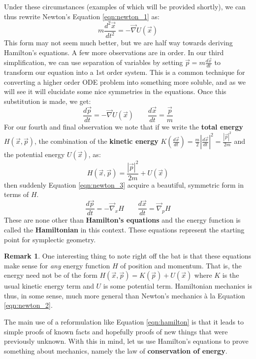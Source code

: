 \documentclass[12pt]{article}
\theoremstyle{definition}
\newtheorem{remark}[theorem]{Remark}
\numberwithin{equation}{section}
\begin{document}
Under these circumstances (examples of which will be provided shortly), we can thus rewrite Newton's Equation \ref{eqn:newton_1} as:
\begin{equation} \label{eqn:newton_2}
m \frac{d^2\vec{x}}{dt^2} = -\vec{\nabla} U(\vec{x})
\end{equation}
This form may not seem much better, but we are half way towards deriving Hamilton's equations. A few more observations are in order. In our third simplification, we can use separation of variables by setting $\vec{p} = m\frac{d\vec{x}}{dt}$ to transform our equation into a 1st order system. This is a common technique for converting a higher order ODE problem into something more soluble, and as we will see it will elucidate some nice symmetries in the equations. Once this substitution is made, we get:
\begin{equation} \label{eqn:newton_3}
\frac{d\vec{p}}{dt} = -\vec{\nabla} U(\vec{x}) \qquad \frac{d\vec{x}}{dt} = \frac{\vec{p}}{m}
\end{equation}
For our fourth and final observation we note that if we write the {\bf total energy} $H(\vec{x},\vec{p})$, the combination of the {\bf kinetic energy} $K(\frac{d\vec{x}}{dt}) = \frac{m}{2}|\frac{d\vec{x}}{dt}|^2 = \frac{|\vec{p}|^2}{2m}$ and the potential energy $U(\vec{x})$, as:
\[
H(\vec{x},\vec{p}) = \frac{|\vec{p}|^2}{2m} + U(\vec{x})
\]
then suddenly Equation \ref{eqn:newton_3} acquire a beautiful, symmetric form in terms of $H$.
\begin{equation} \label{eqn:hamilton}
\frac{d\vec{p}}{dt} = -\vec{\nabla}_x H  \qquad \frac{d\vec{x}}{dt} = \vec{\nabla}_p H 
\end{equation}
These are none other than {\bf Hamilton's equations} and the energy function is called the {\bf Hamiltonian} in this context. These equations represent the starting point for symplectic geometry. 

\begin{remark} One interesting thing to note right off the bat is that these equations make sense for \emph{any} energy function $H$ of position and momentum. That is, the energy need not be of the form $H(\vec{x},\vec{p}) = K(\vec{p}) + U(\vec{x})$ where $K$ is the usual kinetic energy term and $U$ is some potential term. Hamiltonian mechanics is thus, in some sense, much more general than Newton's mechanics \`{a} la Equation \ref{eqn:newton_2}.\end{remark}

The main use of a reformulation like Equation \ref{eqn:hamilton} is that it leads to simple proofs of known facts and hopefully proofs of new things that were previously unknown. With this in mind, let us use Hamilton's equations to prove something about mechanics, namely the law of {\bf conservation of energy}.
\end{document}
